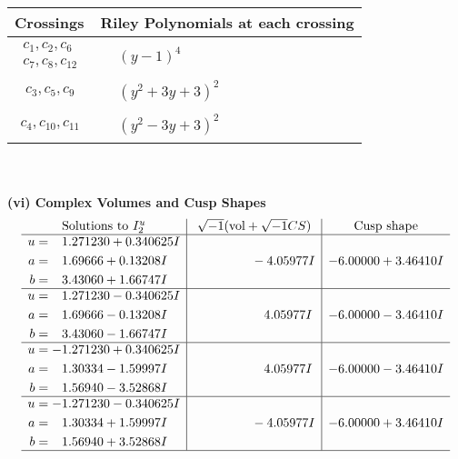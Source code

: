 \documentclass[1p]{elsarticle_modified}
\theoremstyle{definition}
\newcommand{\I}{\sqrt{-1}}
\begin{document}
\begin{tabular}{m{50pt}|m{274pt}}
Crossings & \hspace{64pt}Riley Polynomials at each crossing \\
\hline $$\begin{aligned}c_{1},c_{2},c_{6}\\c_{7},c_{8},c_{12}\end{aligned}$$&$\begin{aligned}
&(y-1)^4
\end{aligned}$\\
\hline $$\begin{aligned}c_{3},c_{5},c_{9}\end{aligned}$$&$\begin{aligned}
&(y^2+3 y+3)^2
\end{aligned}$\\
\hline $$\begin{aligned}c_{4},c_{10},c_{11}\end{aligned}$$&$\begin{aligned}
&(y^2-3 y+3)^2
\end{aligned}$\\
\hline
\end{tabular}\\~\\
\newpage\flushleft \textbf{(vi) Complex Volumes and Cusp Shapes}
$$\begin{array}{c|c|c}  
\text{Solutions to }I^u_{2}& \I (\text{vol} + \sqrt{-1}CS) & \text{Cusp shape}\\
 \hline 
\begin{aligned}
u &= \phantom{-}1.271230 + 0.340625 I \\
a &= \phantom{-}1.69666 + 0.13208 I \\
b &= \phantom{-}3.43060 + 1.66747 I\end{aligned}
 & \phantom{-0.000000 } -4.05977 I & -6.00000 + 3.46410 I \\ \hline\begin{aligned}
u &= \phantom{-}1.271230 - 0.340625 I \\
a &= \phantom{-}1.69666 - 0.13208 I \\
b &= \phantom{-}3.43060 - 1.66747 I\end{aligned}
 & \phantom{-0.000000 -}4.05977 I & -6.00000 - 3.46410 I \\ \hline\begin{aligned}
u &= -1.271230 + 0.340625 I \\
a &= \phantom{-}1.30334 - 1.59997 I \\
b &= \phantom{-}1.56940 - 3.52868 I\end{aligned}
 & \phantom{-0.000000 -}4.05977 I & -6.00000 - 3.46410 I \\ \hline\begin{aligned}
u &= -1.271230 - 0.340625 I \\
a &= \phantom{-}1.30334 + 1.59997 I \\
b &= \phantom{-}1.56940 + 3.52868 I\end{aligned}
 & \phantom{-0.000000 } -4.05977 I & -6.00000 + 3.46410 I\\
 \hline 
 \end{array}$$\newpage\newpage\renewcommand{\arraystretch}{1}
\end{document}
